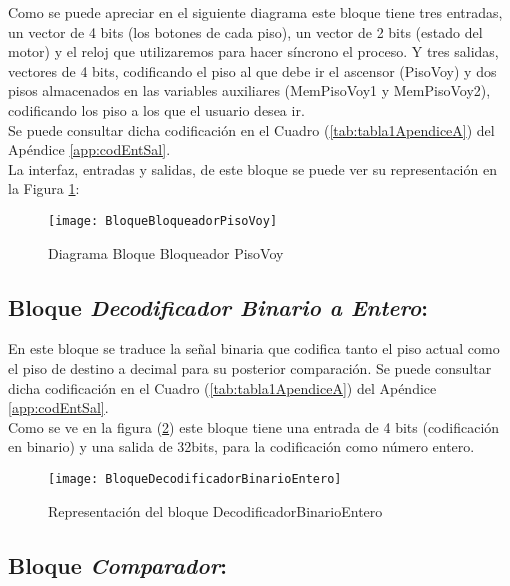 	Como se puede apreciar en el siguiente diagrama este bloque tiene tres entradas, un vector de 4 bits (los botones de cada piso), un vector de 2 bits (estado del motor) y el reloj que utilizaremos para hacer síncrono el proceso. Y tres salidas, vectores de 4 bits, codificando el piso al que debe ir el ascensor (PisoVoy) y dos pisos almacenados en las variables auxiliares (MemPisoVoy1 y MemPisoVoy2), codificando los piso a los que el usuario desea ir. \\
	
	Se puede consultar dicha codificación en el Cuadro (\ref{tab:tabla1ApendiceA}) del Apéndice \ref{app:codEntSal}. \\
    
    La interfaz, entradas y salidas, de este bloque se puede ver su representación en la Figura \ref{fig:BloqueBloqueadorPisoVoy}:
    
    \begin{figure}[H]
		    \centering
		    \hspace*{-1.8cm}
		    \texttt{[image: BloqueBloqueadorPisoVoy]}
		    \caption{Diagrama Bloque Bloqueador PisoVoy}
		    \label{fig:BloqueBloqueadorPisoVoy}
	\end{figure}
	
\subsection{Bloque \textit{Decodificador Binario a Entero}:} \label{bloque:DecodificadorBinarioEntero}
	En este bloque se traduce la señal binaria que codifica tanto el piso actual como el piso de destino a decimal para su posterior comparación.
	Se puede consultar dicha codificación en el Cuadro (\ref{tab:tabla1ApendiceA}) del Apéndice \ref{app:codEntSal}. \\ 

	Como se ve en la figura (\ref{fig:BloqueDecodificadorBinarioEntero}) este bloque tiene una entrada de 4 bits (codificación en binario) y una salida de 32bits, para la codificación como número entero.
	\begin{figure}[H]
		    \centering
		    \texttt{[image: BloqueDecodificadorBinarioEntero]}
		    \caption{Representación del bloque DecodificadorBinarioEntero}
		    \label{fig:BloqueDecodificadorBinarioEntero}
	\end{figure}

\subsection{Bloque \textit{Comparador}:} \label{bloque:Comparador}

